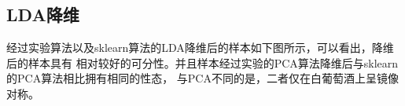 \documentclass[notitlepage]{article}
\begin{document}
\subsection*{LDA降维}

经过实验算法以及sklearn算法的LDA降维后的样本如下图所示，可以看出，降维后的样本具有
相对较好的可分性。并且样本经过实验的PCA算法降维后与sklearn的PCA算法相比拥有相同的性态，
与PCA不同的是，二者仅在白葡萄酒上呈镜像对称。

\begin{figure}[htbp]
	\centering
	\hspace{3pt}
	\\
\end{figure}
\end{document}

